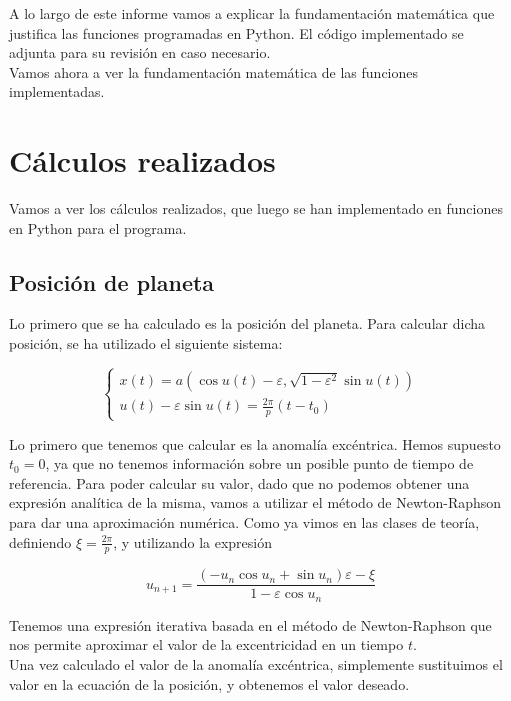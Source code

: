 \documentclass[12pt]{article}
\begin{document}
A lo largo de este informe vamos a explicar la fundamentación
matemática que justifica las funciones programadas en Python. El
código implementado se adjunta para su revisión en caso necesario.\\

Vamos ahora a ver la fundamentación matemática de las funciones
implementadas.

\section{Cálculos realizados}

Vamos a ver los cálculos realizados, que luego se han implementado
en funciones en Python para el programa.

\subsection{Posición de planeta}

Lo primero que se ha calculado es la posición del planeta. Para
calcular dicha posición, se ha utilizado el siguiente sistema:

\begin{equation}
  \left\{
    \begin{array}{l}
      x(t) = a(\cos{u(t)} - \varepsilon, \sqrt{1 - \varepsilon^2}\sin{u(t)}) \\
      u(t) - \varepsilon \sin{u(t)} = \frac{2\pi}{p}(t - t_0)      
    \end{array}
  \right.
  \label{eq:sist1}
\end{equation}

Lo primero que tenemos que calcular es la anomalía excéntrica. Hemos
supuesto $t_0 = 0$, ya que no tenemos información sobre un posible
punto de tiempo de referencia. Para poder calcular su valor, dado que
no podemos obtener una expresión analítica de la misma, vamos a
utilizar el método de Newton-Raphson para dar una aproximación
numérica.  Como ya vimos en las clases de teoría, definiendo
$\xi = \frac{2\pi}{p}$, y utilizando la expresión

\[
u_{n+1} = \frac{(-u_n\cos{u_n} + \sin{u_n})\varepsilon - \xi}{1 -
  \varepsilon \cos{u_n}}
\]

Tenemos una expresión iterativa basada en el método de Newton-Raphson
que nos permite aproximar el valor de la excentricidad en un tiempo
$t$.\\

Una vez calculado el valor de la anomalía excéntrica, simplemente 
sustituimos el valor en la ecuación de la posición, y obtenemos el
valor deseado.
\end{document}
